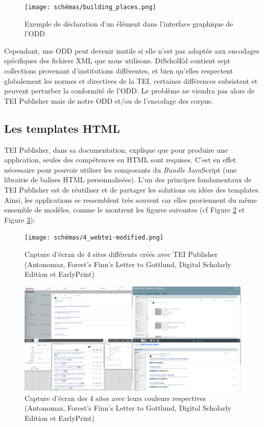 \newpage

 \begin{figure}[H]
        \centering
        \texttt{[image: schémas/building\_places.png]}
        \caption{Exemple de déclaration d’un élément dans l’interface graphique de l’ODD}
        \label{fig:schémas01}
    \end{figure}

Cependant, une ODD peut devenir inutile si elle n'est pas adaptée aux encodages spécifiques des fichiers XML que nous utilisons. DiScholEd contient sept collections provenant d'institutions différentes, et bien qu'elles respectent globalement les normes et directives de la TEI, certaines différences subsistent et peuvent perturber la conformité de l'ODD. Le problème ne viendra pas alors de TEI Publisher mais de notre ODD et/ou de l'encodage des corpus.

\subsection{Les templates HTML}

TEI Publisher, dans sa documentation, explique que pour produire une application, seules des compétences en HTML sont requises. C'est en effet nécessaire pour pouvoir utiliser les composants du \textit{Bundle} JavaScript (une librairie de balises HTML personnalisées). L'un des principes fondamentaux de TEI Publisher est de réutiliser et de partager les solutions ou idées des templates. Ainsi, les applications se ressemblent très souvent car elles proviennent du même ensemble de modèles, comme le montrent les figures suivantes (cf Figure \ref{fig:schémas02} et Figure \ref{fig:schémas03}):

\begin{figure}[H]
\centering
\texttt{[image: schémas/4\_webtei-modified.png]}
\caption{Capture d'écran de 4 sites différents créés avec TEI Publisher (Antonomaz, Forest's Finn's Letter to Gottlund, Digital Scholarly Edition et EarlyPrint) }
\label{fig:schémas02}
\end{figure}

\begin{figure}[H]
\centering
\includegraphics[width=1\linewidth]{schémas/4_webtei.png}
\caption{Capture d'écran des 4 sites avec leurs couleurs respectives (Antonomaz, Forest's Finn's Letter to Gottlund, Digital Scholarly Edition et EarlyPrint)}
\label{fig:schémas03}
\end{figure} 

